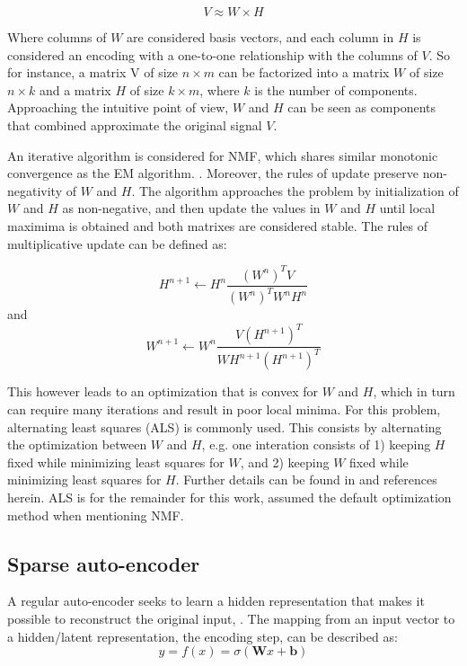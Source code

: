 \documentclass{article}
\begin{document}
\begin{equation}
V \approx W \times H
\end{equation}

Where columns of $W$ are considered basis vectors, and each column in $H$ is considered an encoding with a one-to-one relationship with the columns of $V$. So for instance, a matrix V of size $n \times m$ can be factorized into a matrix $W$ of size $n \times k$ and a matrix $H$ of size $k \times m$, where $k$ is the number of components. Approaching the intuitive point of view, $W$ and $H$ can be seen as components that combined approximate the original signal $V$.

An iterative algorithm is considered for NMF, which shares similar monotonic convergence as the EM algorithm. \cite{Dempster1977}. Moreover, the rules of update preserve non-negativity of $W$ and $H$. The algorithm approaches the problem by initialization of $W$ and $H$ as non-negative, and then update the values in $W$ and $H$ until local maximima is obtained and both matrixes are considered stable. The rules of multiplicative update can be defined as:

\begin{equation}
H^{n+1} \leftarrow H^{n} \frac{(W^n)^TV}{(W^n)^TW^nH^n}
\end{equation}
and 
\begin{equation}
W^{n+1} \leftarrow W^{n} \frac{V(H^{n+1})^T}{WH^{n+1}(H^{n+1})^T}
\end{equation}

This however leads to an optimization that is convex for $W$ and $H$, which in turn can require many iterations and result in poor local minima. For this problem, alternating least squares (ALS) is commonly used. This consists by alternating the optimization between $W$ and $H$, e.g. one interation consists of 1) keeping $H$ fixed while minimizing least squares for $W$, and 2) keeping $W$ fixed while minimizing least squares for $H$. Further details can be found in  \cite{Langville2014} and references herein. ALS is for the remainder for this work, assumed the default optimization method when mentioning NMF.

\subsection{Sparse auto-encoder}
A regular auto-encoder seeks to learn a hidden representation that makes it possible to reconstruct the original input, \cite{Vincent}. The mapping from an input vector to a hidden/latent representation, the encoding step, can be described as:
\begin{equation}
y = f(x) = \sigma(\mathbf{W}x + \mathbf{b})
\end{equation}
\end{document}
